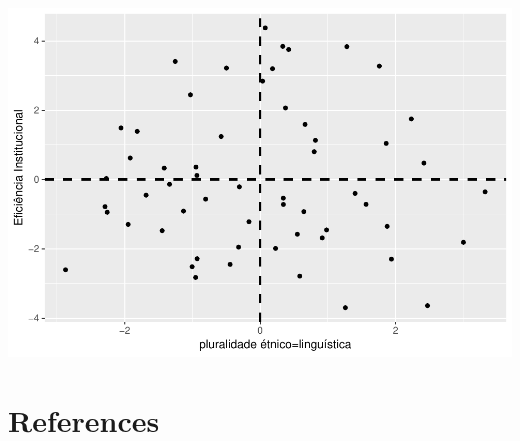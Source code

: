 \documentclass[]{elsarticle} %
\makeatletter
\def\maxwidth{\ifdim\Gin@nat@width>\linewidth\linewidth
\else\Gin@nat@width\fi}
\let\Oldincludegraphics\includegraphics
\renewcommand{\includegraphics}[1]{\Oldincludegraphics[width=\maxwidth]{#1}}
\makeatother
\begin{document}
\includegraphics{Artigo_ad_files/figure-latex/unnamed-chunk-1-1.pdf}

\section*{References}\label{references}
\end{document}
